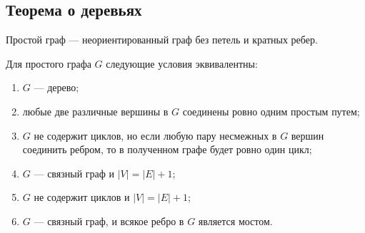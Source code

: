 \subsection{Теорема о деревьях}

\begin{defn}
    Простой граф --- неориентированный граф без петель и кратных ребер.
\end{defn}

\begin{theorem}
    Для простого графа $G$ следующие условия эквивалентны:

    \begin{enumerate}
        \item $G$ --- дерево;
        
        \item любые две различные вершины в $G$ соединены ровно одним простым путем;
        
        \item $G$ не содержит циклов, но если любую пару несмежных в $G$ вершин соединить ребром, то в полученном графе будет ровно один цикл;

        \item $G$ --- связный граф и $|V| = |E| + 1$;

        \item $G$ не содержит циклов и $|V| = |E| + 1$;

        \item $G$ --- связный граф, и всякое ребро в $G$ является мостом.
    \end{enumerate}
\end{theorem}


